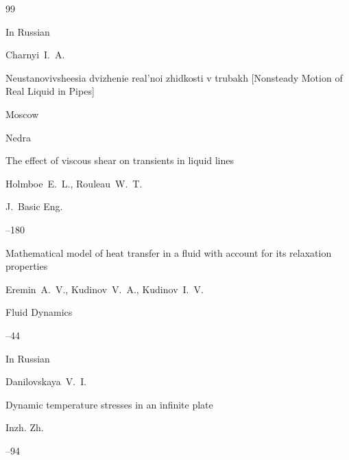 \begin{thebibliography}{99}

\lang In Russian

\by Charnyi~I.~A.

\book Neustanovivsheesia dvizhenie real'noi zhidkosti v trubakh \rm  [Nonsteady Motion of Real Liquid in Pipes]

\publaddr Moscow

\publ Nedra







\paper The effect of viscous shear on transients in liquid lines

\by 	Holmboe~E.~L., Rouleau~W.~T.


\jour J.~Basic Eng.



--180 






\paper Mathematical model of heat transfer in a fluid with account for its relaxation properties

\by Eremin~A.~V., Kudinov~V.~A., Kudinov~I.~V.

\jour Fluid Dynamics




--44








\lang In Russian

\by  Danilovskaya~V.~I.

\paper Dynamic temperature stresses in an infinite plate

\jour Inzh. Zh.




--94




\end{thebibliography}
